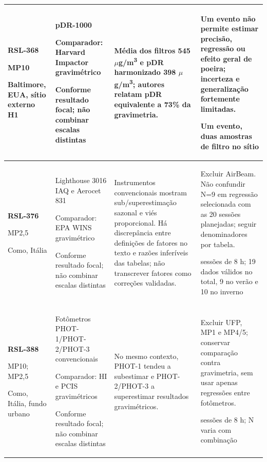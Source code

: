 \begin{longtable}{|P{0.18\textwidth}|P{0.25\textwidth}|P{0.28\textwidth}|P{\arrayrulewidth\relax}|}
\textbf{RSL-368}\par\textcite{rsl368}\par MP10\par Baltimore, EUA, sítio externo H1 & pDR-1000\par\medskip Comparador: Harvard Impactor gravimétrico\par\medskip Conforme resultado focal; não combinar escalas distintas & Média dos filtros 545 \ensuremath{\mu}g/m\textsuperscript{3} e pDR harmonizado 398 \ensuremath{\mu}g/m\textsuperscript{3}; autores relatam pDR equivalente a 73\% da gravimetria. & Um evento não permite estimar precisão, regressão ou efeito geral de poeira; incerteza e generalização fortemente limitadas.\par\medskip Um evento, duas amostras de filtro no sítio\\\hline
\textbf{RSL-376}\par\textcite{rsl376}\par MP2,5\par Como, Itália & Lighthouse 3016 IAQ e Aerocet 831\par\medskip Comparador: EPA WINS gravimétrico\par\medskip Conforme resultado focal; não combinar escalas distintas & Instrumentos convencionais mostram sub/superestimação sazonal e viés proporcional. Há discrepância entre definições de fatores no texto e razões inferíveis das tabelas; não transcrever fatores como correções validadas. & Excluir AirBeam. Não confundir N=9 em regressão selecionada com as 20 sessões planejadas; seguir denominadores por tabela.\par{} sessões de 8 h; 19 dados válidos no total, 9 no verão e 10 no inverno\\\hline
\textbf{RSL-388}\par\textcite{rsl388}\par MP10; MP2,5\par Como, Itália, fundo urbano & Fotômetros PHOT-1/PHOT-2/PHOT-3 convencionais\par\medskip Comparador: HI e PCIS gravimétricos\par\medskip Conforme resultado focal; não combinar escalas distintas & No mesmo contexto, PHOT-1 tendeu a subestimar e PHOT-2/PHOT-3 a superestimar resultados gravimétricos. & Excluir UFP, MP1 e MP4/5; conservar comparação contra gravimetria, sem usar apenas regressões entre fotômetros.\par{} sessões de 8 h; N varia com combinação\\\hline

\end{longtable}
